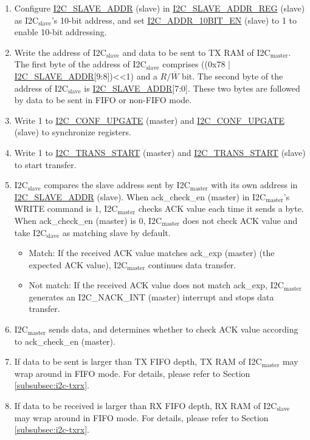 \documentclass[main\_\_EN.tex]{subfiles}
\begin{document}
\begin{enumerate}
\item Configure \hyperref[fielddesc:I2CSLAVEADDR]{I2C\_SLAVE\_ADDR} (slave) in \hyperref[regdesc:I2CSLAVEADDRREG]{I2C\_SLAVE\_ADDR\_REG} (slave) as I2C$_\text{slave}$'s 10-bit address, and set \hyperref[fielddesc:I2CADDR10BITEN]{I2C\_ADDR\_10BIT\_EN} (slave) to 1 to enable 10-bit addressing.
\item Write the address of I2C$_\text{slave}$ and data to be sent to TX RAM of I2C$_\text{master}$. The first byte of the address of I2C$_\text{slave}$ comprises ((0x78 | \hyperref[fielddesc:I2CSLAVEADDR]{I2C\_SLAVE\_ADDR}[9:8])<<1) and a $R/\overline W$ bit. The second byte of the address of I2C$_\text{slave}$ is \hyperref[fielddesc:I2CSLAVEADDR]{I2C\_SLAVE\_ADDR}[7:0]. These two bytes are followed by data to be sent in FIFO or non-FIFO mode.
\item Write 1 to \hyperref[fielddesc:I2CCONFUPGATE]{I2C\_CONF\_UPGATE} (master) and \hyperref[fielddesc:I2CCONFUPGATE]{I2C\_CONF\_UPGATE} (slave) to synchronize registers.
\item Write 1 to \hyperref[fielddesc:I2CTRANSSTART]{I2C\_TRANS\_START} (master) and \hyperref[fielddesc:I2CTRANSSTART]{I2C\_TRANS\_START} (slave) to start transfer.
\item I2C$_\text{slave}$ compares the slave address sent by I2C$_\text{master}$ with its own address in \hyperref[fielddesc:I2CSLAVEADDR]{I2C\_SLAVE\_ADDR} (slave). When ack\_check\_en (master) in I2C$_\text{master}$'s WRITE command is 1, I2C$_\text{master}$ checks ACK value each time it sends a byte. When ack\_check\_en (master) is 0, I2C$_\text{master}$ does not check ACK value and take I2C$_\text{slave}$ as matching slave by default.
\begin{itemize}
\item Match: If the received ACK value matches ack\_exp (master) (the expected ACK value), I2C$_\text{master}$ continues data transfer.
\item Not match: If the received ACK value does not match ack\_exp, I2C$_\text{master}$ generates an I2C\_NACK\_INT (master) interrupt and stops data transfer.
\end{itemize}


\item I2C$_\text{master}$ sends data, and determines whether to check ACK value according to ack\_check\_en (master).

\item If data to be sent is larger than TX FIFO depth, TX RAM of I2C$_\text{master}$ may wrap around in FIFO mode. For details, please refer to Section \ref{subsubsec:i2c-txrx}. 
\item If data to be received is larger than RX FIFO depth, RX RAM of I2C$_\text{slave}$ may wrap around in FIFO mode. For details, please refer to Section \ref{subsubsec:i2c-txrx}. 


\end{enumerate}
\end{document}
